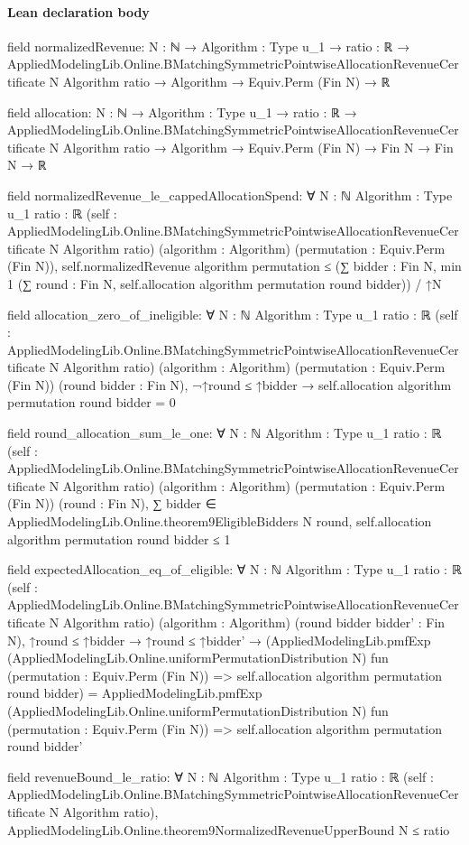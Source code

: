 \documentclass[10pt]{article}
\begin{document}
\paragraph{Lean declaration body}
\begin{ReviewVerbatim}
field normalizedRevenue:
{N : ℕ} →
  {Algorithm : Type u_1} →
    {ratio : ℝ} →
      AppliedModelingLib.Online.BMatchingSymmetricPointwiseAllocationRevenueCertificate N Algorithm ratio →
        Algorithm → Equiv.Perm (Fin N) → ℝ

field allocation:
{N : ℕ} →
  {Algorithm : Type u_1} →
    {ratio : ℝ} →
      AppliedModelingLib.Online.BMatchingSymmetricPointwiseAllocationRevenueCertificate N Algorithm ratio →
        Algorithm → Equiv.Perm (Fin N) → Fin N → Fin N → ℝ

field normalizedRevenue_le_cappedAllocationSpend:
∀ {N : ℕ} {Algorithm : Type u_1} {ratio : ℝ}
  (self : AppliedModelingLib.Online.BMatchingSymmetricPointwiseAllocationRevenueCertificate N Algorithm ratio)
  (algorithm : Algorithm) (permutation : Equiv.Perm (Fin N)),
  self.normalizedRevenue algorithm permutation ≤
    (∑ bidder : Fin N, min 1 (∑ round : Fin N, self.allocation algorithm permutation round bidder)) / ↑N

field allocation_zero_of_ineligible:
∀ {N : ℕ} {Algorithm : Type u_1} {ratio : ℝ}
  (self : AppliedModelingLib.Online.BMatchingSymmetricPointwiseAllocationRevenueCertificate N Algorithm ratio)
  (algorithm : Algorithm) (permutation : Equiv.Perm (Fin N)) (round bidder : Fin N),
  ¬↑round ≤ ↑bidder → self.allocation algorithm permutation round bidder = 0

field round_allocation_sum_le_one:
∀ {N : ℕ} {Algorithm : Type u_1} {ratio : ℝ}
  (self : AppliedModelingLib.Online.BMatchingSymmetricPointwiseAllocationRevenueCertificate N Algorithm ratio)
  (algorithm : Algorithm) (permutation : Equiv.Perm (Fin N)) (round : Fin N),
  ∑ bidder ∈ AppliedModelingLib.Online.theorem9EligibleBidders N round,
      self.allocation algorithm permutation round bidder ≤
    1

field expectedAllocation_eq_of_eligible:
∀ {N : ℕ} {Algorithm : Type u_1} {ratio : ℝ}
  (self : AppliedModelingLib.Online.BMatchingSymmetricPointwiseAllocationRevenueCertificate N Algorithm ratio)
  (algorithm : Algorithm) (round bidder bidder' : Fin N),
  ↑round ≤ ↑bidder →
    ↑round ≤ ↑bidder' →
      (AppliedModelingLib.pmfExp (AppliedModelingLib.Online.uniformPermutationDistribution N)
          fun (permutation : Equiv.Perm (Fin N)) => self.allocation algorithm permutation round bidder) =
        AppliedModelingLib.pmfExp (AppliedModelingLib.Online.uniformPermutationDistribution N)
          fun (permutation : Equiv.Perm (Fin N)) => self.allocation algorithm permutation round bidder'

field revenueBound_le_ratio:
∀ {N : ℕ} {Algorithm : Type u_1} {ratio : ℝ}
  (self : AppliedModelingLib.Online.BMatchingSymmetricPointwiseAllocationRevenueCertificate N Algorithm ratio),
  AppliedModelingLib.Online.theorem9NormalizedRevenueUpperBound N ≤ ratio
\end{ReviewVerbatim}
\end{document}
